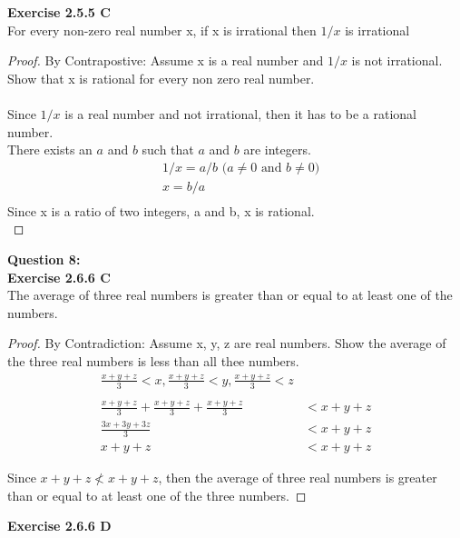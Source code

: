 \documentclass[11pt]{article}
\begin{document}
\noindent \textbf{Exercise 2.5.5 C}\\

\noindent For every non-zero real number x, if x is irrational then $1/x$ is irrational\\
\begin{proof}
By Contrapostive: Assume x is a real number and $1/x$ is not irrational. Show that x is rational for every non zero real number. \\\\
Since $1/x$ is a real number and not irrational, then it has to be a rational number.\\
There exists an $a$ and $b$ such that $a$ and $b$ are integers.\\
\begin{align*}
&1/x = a/b \text{ ($a \not = 0$ and $b \not = 0$)}\\
&x = b/a\\
\end{align*}
Since x is a ratio of two integers, a and b, x is rational.\\ \qedhere
\end{proof}

\newpage
\noindent \textbf{Question 8:} \\


\noindent \textbf{Exercise 2.6.6 C}\\

\noindent The average of three real numbers is greater than or equal to at least one of the numbers.\\
\begin{proof}
By Contradiction: Assume x, y, z are real numbers. Show the average of the three real numbers is less than all thee numbers.
\begin{align*}
\frac{x + y + z}{3} < x,  \frac{x + y + z}{3} < y, \frac{x+y+z}{3} < z\\
\\
\frac{x+y+z}{3} + \frac{x+y+z}{3} + \frac{x+y+z}{3} &< x + y + z\\
\frac{3x + 3y + 3z}{3} &< x + y + z\\
x + y + z &< x + y + z
\end{align*}

\noindent Since $x + y + z \not < x + y + z$, then the average of three real numbers is greater than or equal to at least one of the three numbers. \qedhere
\end{proof}

\noindent \textbf{Exercise 2.6.6 D}\\
\end{document}
